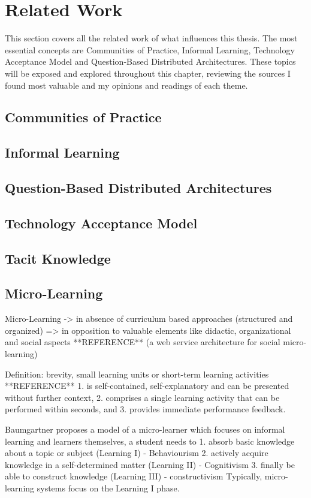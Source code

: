 \chapter{Related Work}
\label{cha:relatedwork}

This section covers all the related work of what influences this thesis.
The most essential concepts are Communities of Practice, Informal Learning, 
Technology Acceptance Model 
and Question-Based Distributed Architectures.
These topics will be exposed and explored throughout this chapter, 
reviewing the sources I found most valuable and my opinions and 
readings of each theme.


\section{Communities of Practice}
\section{Informal Learning}
\section{Question-Based Distributed Architectures}
\section{Technology Acceptance Model}

\section{Tacit Knowledge}

\section{Micro-Learning}

Micro-Learning -> in absence of curriculum based approaches 
(structured and organized)
=> in opposition to valuable elements like didactic, organizational and social 
aspects **REFERENCE** (a web service architecture for social micro-learning)

Definition: brevity, small learning units or short-term learning activities
**REFERENCE**
1. is self-contained, self-explanatory and can be presented without further context,
2. comprises a single learning activity that can be performed within seconds, and
3. provides immediate performance feedback.

Baumgartner proposes a model of a micro-learner which focuses on informal learning
and learners themselves, a student needs to
1. absorb basic knowledge about a topic or subject (Learning I) - Behaviourism
2. actively acquire knowledge in a self-determined matter (Learning II) - Cognitivism
3. finally be able to construct knowledge (Learning III) - constructivism
Typically, micro-learning systems focus on the Learning I phase.

